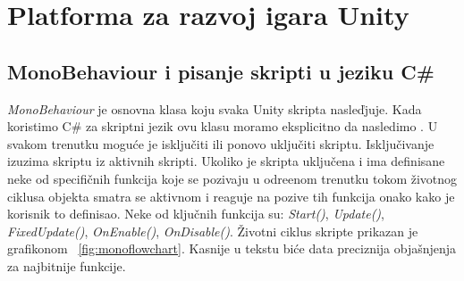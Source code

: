 \clearpage
\section{Platforma za razvoj igara Unity}

\subsection{MonoBehaviour i pisanje skripti u jeziku C\#}

\emph{MonoBehaviour} je osnovna klasa koju svaka Unity skripta nasle\v{dj}uje. Kada
koristimo C\# za skriptni jezik ovu klasu moramo eksplicitno da nasledimo \cite{unitydocs}. U svakom trenutku
mogu\'ce je isklju\v{c}iti ili ponovo uklju\v{c}iti skriptu. Isklju\v{c}ivanje
izuzima skriptu iz aktivnih skripti. Ukoliko je skripta uklju\v{c}ena i ima definisane
neke od specifi\v{c}nih funkcija koje se pozivaju u odre\dj enom trenutku tokom
\v{z}ivotnog ciklusa objekta smatra se aktivnom i reaguje na pozive tih funkcija
onako kako je korisnik to definisao. Neke od klju\v{c}nih funkcija su: \emph{Start()}, \emph{Update()},
\emph{FixedUpdate()}, \emph{OnEnable()}, \emph{OnDisable()}. \v{Z}ivotni ciklus skripte prikazan
je grafikonom ~\ref{fig:monoflowchart}. Kasnije u tekstu bi\'ce data preciznija obja\v{s}njenja
za najbitnije funkcije.

